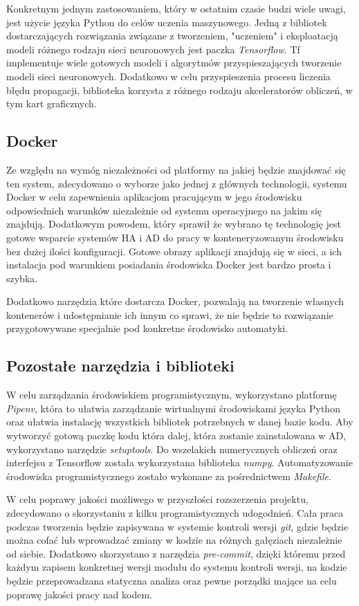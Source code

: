 Konkretnym jednym zastosowaniem, który w ostatnim czasie budzi wiele uwagi, jest użycie języka Python do celów uczenia maszynowego. Jedną z bibliotek dostarczających rozwiązania związane z tworzeniem, "uczeniem" i eksploatacją modeli różnego rodzaju sieci neuronowych jest paczka \textit{Tensorflow}. Tf implementuje wiele gotowych modeli i algorytmów przyspieszających tworzenie modeli sieci neuronowych. Dodatkowo w celu przyspieszenia procesu liczenia błędu propagacji, biblioteka korzysta z różnego rodzaju akceleratorów obliczeń, w tym kart graficznych.

\subsection{Docker}
Ze względu na wymóg niezależności od platformy na jakiej będzie znajdować się ten system, zdecydowano o wyborze jako jednej z głównych technologii, systemu Docker w celu zapewnienia aplikacjom pracującym w jego środowisku odpowiednich warunków niezależnie od systemu operacyjnego na jakim się znajdują. Dodatkowym powodem, który sprawił że wybrano tę technologię jest gotowe wsparcie systemów HA i AD do pracy w konteneryzowanym środowisku bez dużej ilości konfiguracji. Gotowe obrazy aplikacji znajdują się w sieci, a ich instalacja pod warunkiem posiadania środowiska Docker jest bardzo prosta i szybka.

Dodatkowo narzędzia które dostarcza Docker, pozwalają na tworzenie własnych kontenerów i udostępnianie ich innym co sprawi, że nie będzie to rozwiązanie przygotowywane specjalnie pod konkretne środowisko automatyki.

\subsection{Pozostałe narzędzia i biblioteki}
W celu zarządzania środowiskiem programistycznym, wykorzystano platformę \textit{Pipenv}, która to ułatwia zarządzanie wirtualnymi środowiskami języka Python oraz ułatwia instalację wszystkich bibliotek potrzebnych w danej bazie kodu. Aby wytworzyć gotową paczkę kodu która dalej, która zostanie zainstalowana w AD, wykorzystano narzędzie \textit{setuptools}. Do wszelakich numerycznych obliczeń oraz interfejsu z Tensorflow została wykorzystana biblioteka \textit{numpy}. Automatyzowanie środowiska programistycznego zostało wykonane za pośrednictwem \textit{Makefile}. 

W celu poprawy jakości możliwego w przyszłości rozszerzenia projektu, zdecydowano o skorzystaniu z kilku programistycznych udogodnień. Cała praca podczas tworzenia będzie zapisywana w systemie kontroli wersji \textit{git}, gdzie będzie można cofać lub wprowadzać zmiany w kodzie na różnych gałęziach niezależnie od siebie. Dodatkowo skorzystano z narzędzia \textit{pre-commit}, dzięki któremu przed każdym zapisem konkretnej wersji modułu do systemu kontroli wersji, na kodzie będzie przeprowadzana statyczna analiza oraz pewne porządki mające na celu poprawę jakości pracy nad kodem.


